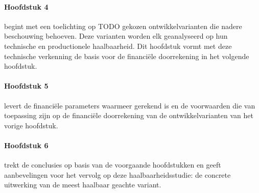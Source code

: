 \paragraph{Hoofdstuk 4} begint met een toelichting op TODO gekozen ontwikkelvarianten die nadere beschouwing behoeven. Deze varianten worden elk geanalyseerd op hun technische en productionele haalbaarheid. Dit hoofdstuk vormt met deze technische verkenning de basis voor de financiële doorrekening in het volgende hoofdstuk.

\paragraph{Hoofdstuk 5} levert de financiële parameters waarmeer gerekend is en de voorwaarden die van toepassing zijn op de financiële doorrekening van de ontwikkelvarianten van het vorige hoofdstuk.

\paragraph{Hoofdstuk 6} trekt de conclusies op basis van de voorgaande hoofdstukken en geeft aanbevelingen voor het vervolg op deze haalbaarheidsstudie: de concrete uitwerking van de meest haalbaar geachte variant.